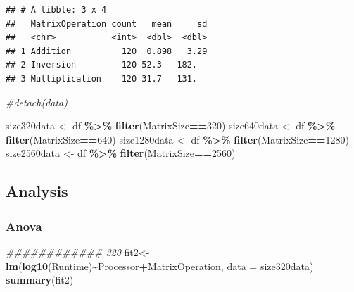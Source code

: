 \documentclass[
]{article}
\newenvironment{Shaded}{\begin{snugshade}}{\end{snugshade}}
\newcommand{\CommentTok}[1]{\textcolor[rgb]{0.56,0.35,0.01}{\textit{#1}}}
\newcommand{\DataTypeTok}[1]{\textcolor[rgb]{0.13,0.29,0.53}{#1}}
\newcommand{\DecValTok}[1]{\textcolor[rgb]{0.00,0.00,0.81}{#1}}
\newcommand{\KeywordTok}[1]{\textcolor[rgb]{0.13,0.29,0.53}{\textbf{#1}}}
\newcommand{\NormalTok}[1]{#1}
\newcommand{\OperatorTok}[1]{\textcolor[rgb]{0.81,0.36,0.00}{\textbf{#1}}}
\newcommand{\StringTok}[1]{\textcolor[rgb]{0.31,0.60,0.02}{#1}}
\begin{document}
\begin{verbatim}
## # A tibble: 3 x 4
##   MatrixOperation count   mean     sd
##   <chr>           <int>  <dbl>  <dbl>
## 1 Addition          120  0.898   3.29
## 2 Inversion         120 52.3   182.  
## 3 Multiplication    120 31.7   131.
\end{verbatim}

\begin{Shaded}
\begin{Highlighting}[]
\CommentTok{\#detach(data) }

\NormalTok{size320data \textless{}{-}}\StringTok{ }\NormalTok{df }\OperatorTok{\%\textgreater{}\%}\StringTok{ }\KeywordTok{filter}\NormalTok{(MatrixSize}\OperatorTok{==}\DecValTok{320}\NormalTok{)}
\NormalTok{size640data \textless{}{-}}\StringTok{ }\NormalTok{df }\OperatorTok{\%\textgreater{}\%}\StringTok{ }\KeywordTok{filter}\NormalTok{(MatrixSize}\OperatorTok{==}\DecValTok{640}\NormalTok{)}
\NormalTok{size1280data \textless{}{-}}\StringTok{ }\NormalTok{df }\OperatorTok{\%\textgreater{}\%}\StringTok{ }\KeywordTok{filter}\NormalTok{(MatrixSize}\OperatorTok{==}\DecValTok{1280}\NormalTok{)}
\NormalTok{size2560data \textless{}{-}}\StringTok{ }\NormalTok{df }\OperatorTok{\%\textgreater{}\%}\StringTok{ }\KeywordTok{filter}\NormalTok{(MatrixSize}\OperatorTok{==}\DecValTok{2560}\NormalTok{)}
\end{Highlighting}
\end{Shaded}

\hypertarget{analysis}{%
\subsection{Analysis}\label{analysis}}

\hypertarget{anova}{%
\subsubsection{Anova}\label{anova}}

\begin{Shaded}
\begin{Highlighting}[]
\CommentTok{\#\#\#\#\#\#\#\#\#\#\#\# 320}
\NormalTok{fit2\textless{}{-}}\KeywordTok{lm}\NormalTok{(}\KeywordTok{log10}\NormalTok{(Runtime)}\OperatorTok{\textasciitilde{}}\NormalTok{Processor}\OperatorTok{+}\NormalTok{MatrixOperation, }\DataTypeTok{data =}\NormalTok{ size320data)}
\KeywordTok{summary}\NormalTok{(fit2)}
\end{Highlighting}
\end{Shaded}
\end{document}
